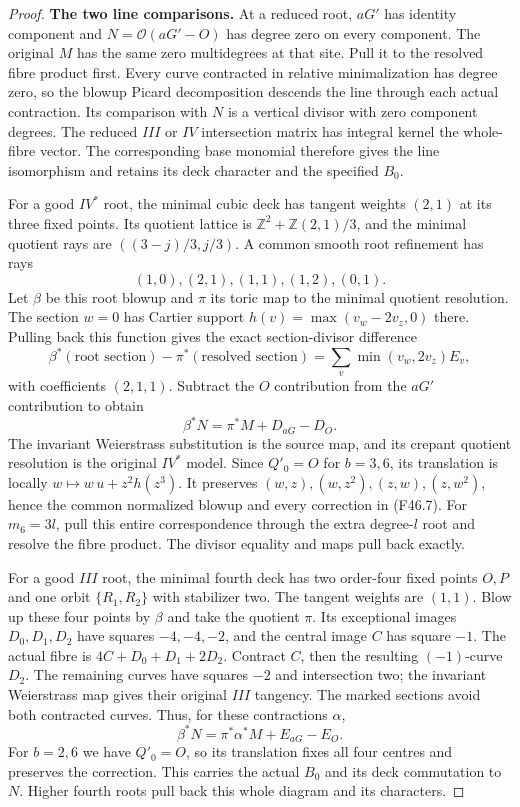 \begin{proof}
\par\medskip\noindent\textbf{The two line comparisons.}
At a reduced root, $aG'$ has identity component and
$N=\mathcal O(aG'-O)$ has degree zero on every component.
The original $M$ has the same zero multidegrees at that site.
Pull it to the resolved fibre product first. Every curve
contracted in relative minimalization has degree zero, so the
blowup Picard decomposition descends the line through each
actual contraction. Its comparison with $N$ is a vertical
divisor with zero component degrees. The reduced $III$ or $IV$
intersection matrix has integral kernel the whole-fibre vector.
The corresponding base monomial therefore gives the line
isomorphism and retains its deck character and the specified $B_0$.

For a good $IV^*$ root, the minimal cubic deck has tangent
weights $(2,1)$ at its three fixed points. Its quotient lattice
is $\mathbb Z^2+\mathbb Z(2,1)/3$, and the minimal quotient
rays are $((3-j)/3,j/3)$. A common smooth root refinement has rays
\[
                  (1,0),(2,1),(1,1),(1,2),(0,1).
\]
Let $\beta$ be this root blowup and $\pi$ its toric map to the
minimal quotient resolution. The section $w=0$ has Cartier
support $h(v)=\max(v_w-2v_z,0)$ there. Pulling back this
function gives the exact section-divisor difference
\[
 \beta^*(\text{root section})-\pi^*(\text{resolved section})
       =\sum_v\min(v_w,2v_z)E_v,
\]
with coefficients $(2,1,1)$. Subtract the $O$ contribution from
the $aG'$ contribution to obtain
\[
                    \beta^*N=\pi^*M+D_{aG}-D_O.                \tag{F46.7}
\]
The invariant Weierstrass substitution is the source map, and
its crepant quotient resolution is the original $IV^*$ model.
Since $Q'_0=O$ for $b=3,6$, its translation is locally
$w\mapsto w\,u+z^2h(z^3)$. It preserves
$(w,z),(w,z^2),(z,w),(z,w^2)$, hence the common normalized
blowup and every correction in (F46.7). For $m_6=3l$, pull this
entire correspondence through the extra degree-$l$ root and
resolve the fibre product. The divisor equality and maps pull
back exactly.

For a good $III$ root, the minimal fourth deck has two
order-four fixed points $O,P$ and one orbit $\{R_1,R_2\}$
with stabilizer two. The tangent weights are $(1,1)$.
Blow up these four points by $\beta$ and take the quotient
$\pi$. Its exceptional images $D_0,D_1,D_2$ have squares
$-4,-4,-2$, and the central image $C$ has square $-1$.
The actual fibre is $4C+D_0+D_1+2D_2$. Contract $C$, then the
resulting $(-1)$-curve $D_2$. The remaining curves have squares
$-2$ and intersection two; the invariant Weierstrass map gives
their original $III$ tangency. The marked sections avoid both
contracted curves. Thus, for these contractions $\alpha$,
\[
                 \beta^*N=\pi^*\alpha^*M+E_{aG}-E_O.           \tag{F46.8}
\]
For $b=2,6$ we have $Q'_0=O$, so its translation fixes all four
centres and preserves the correction. This carries the actual
$B_0$ and its deck commutation to $N$. Higher fourth roots
pull back this whole diagram and its characters.


\end{proof}
